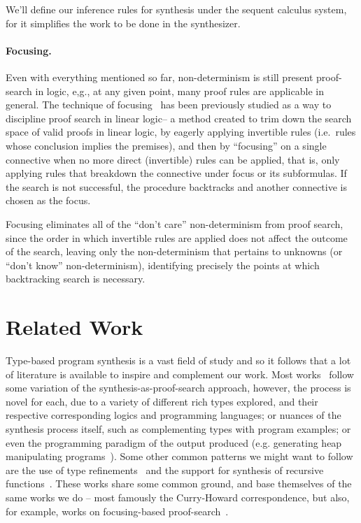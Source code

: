 \documentclass{llncs}
\newcommand{\mypara}[1]{\paragraph{\textbf{#1}.}}
\begin{document}
  
  We'll define our inference rules for synthesis under the sequent
  calculus system, for it simplifies the work to be done in the
  synthesizer.

  \mypara{Focusing}
  
  Even with everything mentioned so far, non-determinism is still
  present proof-search in logic, e,g., at any given point, many proof
  rules are applicable in general. The technique of focusing~\cite{}
  has been previously studied as a way to discipline proof search in
  linear logic-- a method created to trim down the search space of
  valid proofs in linear logic, by eagerly applying invertible rules
  (i.e.~rules whose conclusion implies the premises), and then by
  ``focusing'' on a single connective when no more direct (invertible)
  rules can be applied, that is, only applying rules that breakdown
  the connective under focus or its subformulas. If the search is not
  successful, the procedure backtracks and another connective is
  chosen as the focus.

  Focusing eliminates all of the ``don't care'' non-determinism from
  proof search, since the order in which invertible rules are applied
  does not affect the outcome of the search, leaving only the
  non-determinism that pertains to unknowns (or ``don't know''
  non-determinism), identifying precisely the points at which
  backtracking search is necessary.


\section{Related Work}

Type-based program synthesis is a vast field of study and so it
follows that a lot of literature is available to inspire and
complement our work. Most works~\cite{} follow some variation of the
synthesis-as-proof-search approach, however, the process is novel for
each, due to a variety of different rich types explored, and their
respective corresponding logics and programming languages; or nuances
of the synthesis process itself, such as complementing types with
program examples; or even the programming paradigm of the output
produced (e.g. generating heap manipulating
programs~\cite{DBLP:journals/pacmpl/PolikarpovaS19}).  Some other
common patterns we might want to follow are the use of type
refinements~\cite{} and the support for synthesis of recursive
functions~\cite{}.  These works share some common ground, and base
themselves of the same works we do -- most famously the Curry-Howard
correspondence, but also, for example, works on focusing-based
proof-search~\cite{focusing}.
\end{document}
